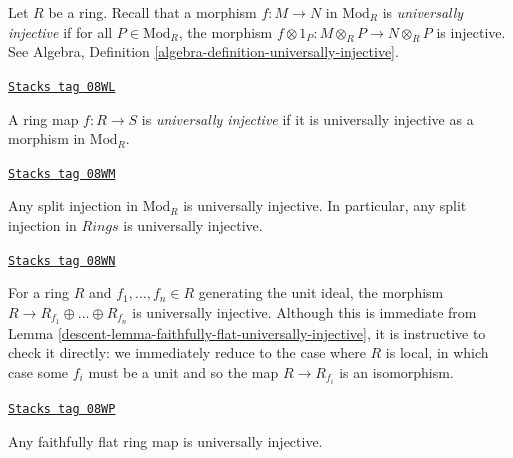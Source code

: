Let $R$ be a ring. Recall that a morphism $f : M \to N$ in $\text{Mod}_R$
is {\it universally injective} if for all $P \in \text{Mod}_R$,
the morphism $f \otimes 1_P: M \otimes_R P \to N \otimes_R P$ is injective.
See Algebra, Definition \ref{algebra-definition-universally-injective}.

\begin{definition}
\label{descent-definition-universally-injective}
\href{https://stacks.math.columbia.edu/tag/08WL}{\texttt{Stacks tag 08WL}}

A ring map $f: R \to S$ is {\it universally injective}
if it is universally injective as a morphism in $\text{Mod}_R$.
\end{definition}

\begin{example}
\label{descent-example-split-injection-universally-injective}
\href{https://stacks.math.columbia.edu/tag/08WM}{\texttt{Stacks tag 08WM}}

Any split injection in $\text{Mod}_R$ is universally injective. In particular,
any split injection in $\textit{Rings}$ is universally injective.
\end{example}

\begin{example}
\label{descent-example-cover-universally-injective}
\href{https://stacks.math.columbia.edu/tag/08WN}{\texttt{Stacks tag 08WN}}

For a ring $R$ and $f_1, \ldots, f_n \in R$ generating the unit
ideal, the morphism $R \to R_{f_1} \oplus \ldots \oplus R_{f_n}$ is
universally injective. Although this is immediate from
Lemma \ref{descent-lemma-faithfully-flat-universally-injective},
it is instructive to check it directly: we immediately reduce to the case
where $R$ is local, in which case some $f_i$ must be a unit and so the map
$R \to R_{f_i}$ is an isomorphism.
\end{example}

\begin{lemma}
\label{descent-lemma-faithfully-flat-universally-injective}
\href{https://stacks.math.columbia.edu/tag/08WP}{\texttt{Stacks tag 08WP}}

Any faithfully flat ring map is universally injective.
\end{lemma}

